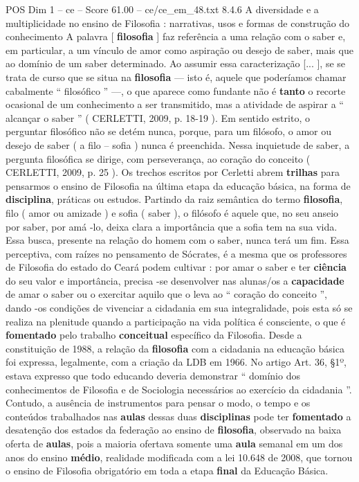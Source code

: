 \begin{textsample}{POS Dim 1 – ce – Score 61.00 – ce/ce\_em\_48.txt}  \label{ex:f1_pos_048}
8.4.6 A diversidade e a multiplicidade no ensino de Filosofia : narrativas, usos e formas de construção do conhecimento A palavra [ \textbf{filosofia} ] faz referência a uma relação com o saber e, em particular, a um vínculo de amor como aspiração ou desejo de saber, mais que ao domínio de um saber determinado.
Ao assumir essa caracterização [... ], se se trata de curso que se situa na \textbf{filosofia} — isto é, aquele que poderíamos chamar cabalmente “ filosófico ” —, o que aparece como fundante não é \textbf{tanto} o recorte ocasional de um conhecimento a ser transmitido, mas a atividade de aspirar a “ alcançar o saber ” ( CERLETTI, 2009, p. 18-19 ).
Em sentido estrito, o perguntar filosófico não se detém nunca, porque, para um filósofo, o amor ou desejo de saber ( a filo – sofia ) nunca é preenchida.
Nessa inquietude de saber, a pergunta filosófica se dirige, com perseverança, ao coração do conceito ( CERLETTI, 2009, p. 25 ).
Os trechos escritos por Cerletti abrem \textbf{trilhas} para pensarmos o ensino de Filosofia na última etapa da educação básica, na forma de \textbf{disciplina}, práticas ou estudos.
Partindo da raiz semântica do termo \textbf{filosofia}, filo ( amor ou amizade ) e sofia ( saber ), o filósofo é aquele que, no seu anseio por saber, por amá -lo, deixa clara a importância que a sofia tem na sua vida.
Essa busca, presente na relação do homem com o saber, nunca terá um fim.
Essa perceptiva, com raízes no pensamento de Sócrates, é a mesma que os professores de Filosofia do estado do Ceará podem cultivar : por amar o saber e ter \textbf{ciência} do seu valor e importância, precisa -se desenvolver nas alunas/os a \textbf{capacidade} de amar o saber ou o exercitar aquilo que o leva ao “ coração do conceito ”, dando -os condições de vivenciar a cidadania em sua integralidade, pois esta só se realiza na plenitude quando a participação na vida política é consciente, o que é \textbf{fomentado} pelo trabalho \textbf{conceitual} específico da Filosofia.
Desde a constituição de 1988, a relação da \textbf{filosofia} com a cidadania na educação básica foi expressa, legalmente, com a criação da LDB em 1966.
No artigo Art. 36, §1º, estava expresso que todo educando deveria demonstrar “ domínio dos conhecimentos de Filosofia e de Sociologia necessários ao exercício da cidadania ”.
Contudo, a ausência de instrumentos para pensar o modo, o tempo e os conteúdos trabalhados nas \textbf{aulas} dessas duas \textbf{disciplinas} pode ter \textbf{fomentado} a desatenção dos estados da federação ao ensino de \textbf{filosofia}, observado na baixa oferta de \textbf{aulas}, pois a maioria ofertava somente uma \textbf{aula} semanal em um dos anos do ensino \textbf{médio}, realidade modificada com a lei 10.648 de 2008, que tornou o ensino de Filosofia obrigatório em toda a etapa \textbf{final} da Educação Básica.

\end{textsample}
